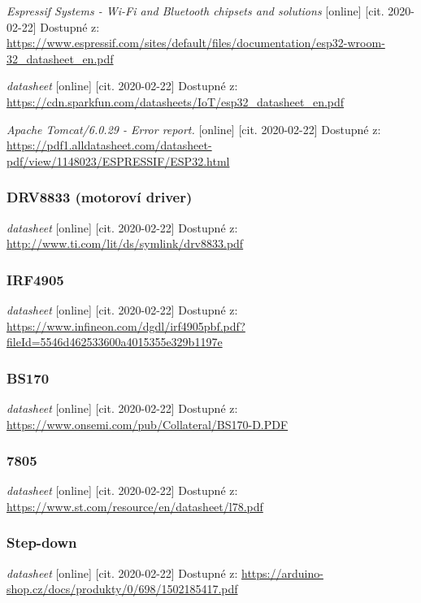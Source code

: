 \documentclass{template/socthesis}
\begin{document}
\begin{thebibliography}{1}
	\textit{Espressif Systems - Wi-Fi and Bluetooth chipsets and solutions } [online] [cit. 2020-02-22] Dostupné z:
	\url{https://www.espressif.com/sites/default/files/documentation/esp32-wroom-32_datasheet_en.pdf}
	
	\textit{datasheet} [online] [cit. 2020-02-22] Dostupné z:
	\url{https://cdn.sparkfun.com/datasheets/IoT/esp32_datasheet_en.pdf}
	
	\textit{Apache Tomcat/6.0.29 - Error report.} [online] [cit. 2020-02-22] Dostupné z:
	\url{https://pdf1.alldatasheet.com/datasheet-pdf/view/1148023/ESPRESSIF/ESP32.html}
	
	\subsubsection{DRV8833 (motoroví driver)}
	
	\textit{datasheet} [online] [cit. 2020-02-22] Dostupné z:
	\url{http://www.ti.com/lit/ds/symlink/drv8833.pdf}
	
	\subsubsection{IRF4905}
	
	\textit{datasheet} [online] [cit. 2020-02-22] Dostupné z:
	\url{https://www.infineon.com/dgdl/irf4905pbf.pdf?fileId=5546d462533600a4015355e329b1197e}
	
	\subsubsection{BS170}
	
	\textit{datasheet} [online] [cit. 2020-02-22] Dostupné z:
	\url{https://www.onsemi.com/pub/Collateral/BS170-D.PDF}
	
	\subsubsection{7805}
	
	\textit{datasheet} [online] [cit. 2020-02-22] Dostupné z:
	\url{https://www.st.com/resource/en/datasheet/l78.pdf}
	
	\subsubsection{Step-down}
	
	\textit{datasheet} [online] [cit. 2020-02-22] Dostupné z:
	\url{https://arduino-shop.cz/docs/produkty/0/698/1502185417.pdf}
	

\end{thebibliography}
\end{document}

